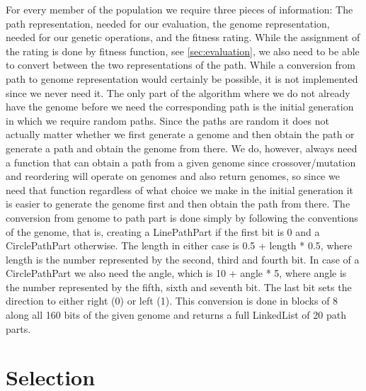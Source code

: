 For every member of the population we require three pieces of information: The path representation, needed for our evaluation, the genome representation, needed for our genetic operations, and the fitness rating. While the assignment of the rating is done by fitness function, see \ref{sec:evaluation}, we also need to be able to convert between the two representations of the path. While a conversion from path to genome representation would certainly be possible, it is not implemented since we never need it. The only part of the algorithm where we do not already have the genome before we need the corresponding path is the initial generation in which we require random paths. Since the paths are random it does not actually matter whether we first generate a genome and then obtain the path or generate a path and obtain the genome from there. We do, however, always need a function that can obtain a path from a given genome since crossover/mutation and reordering will operate on genomes and also return genomes, so since we need that function regardless of what choice we make in the initial generation it is easier to generate the genome first and then obtain the path from there.
The conversion from genome to path part is done simply by following the conventions of the genome, that is, creating a LinePathPart if the first bit is 0 and a CirclePathPart otherwise. The length in either case is 0.5 + length * 0.5, where length is the number represented by the second, third and fourth bit.
In case of a CirclePathPart we also need the angle, which is 10 + angle * 5, where angle is the number represented by the fifth, sixth and seventh bit. The last bit sets the direction to either right (0) or left (1).
This conversion is done in blocks of 8 along all 160 bits of the given genome and returns a full LinkedList of 20 path parts.

\section{Selection} %
\label{sec:selection}

